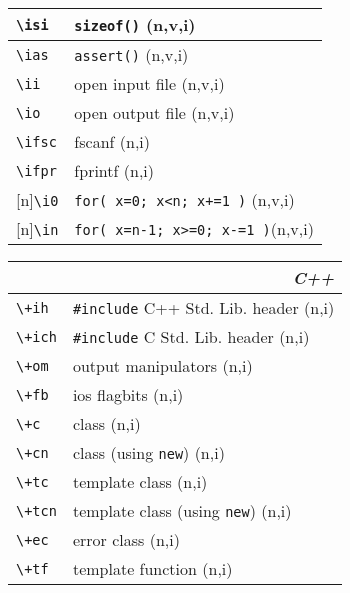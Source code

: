 \documentclass[oneside,11pt,landscape,DIV16]{scrartcl}
\newcommand{\Rep}{{\tiny{[n]}}}
\begin{document}
\begin{multicols}{3}
\begin{center}
\begin{tabular}[]{|p{11mm}|p{60mm}|}
\hline \verb'\isi' & \verb'sizeof()'                    \hfill (n,v,i)\\
\hline \verb'\ias' & \verb'assert()'                    \hfill (n,v,i)\\
\hline \verb'\ii'  & open input file                    \hfill (n,v,i)\\
\hline \verb'\io'  & open output file                   \hfill (n,v,i)\\
\hline \verb'\ifsc'& fscanf                             \hfill (n,i)\\
\hline \verb'\ifpr'& fprintf                            \hfill (n,i)\\
\hline \Rep\verb'\i0'  & \verb'for( x=0; x<n; x+=1 )'   \hfill (n,v,i)\\
\hline \Rep\verb'\in'  & \verb'for( x=n-1; x>=0; x-=1 )'\hfill (n,v,i)\\
\hline
\end{tabular}
%
%
\begin{tabular}[]{|p{12mm}|p{60mm}|}
\hline 
\multicolumn{2}{|r|}{\textsl{C\textbf{++}}} \\
\hline \verb'\+ih'  & \verb$#include$ C++ Std. Lib. header \hfill (n,i)\\
\hline \verb'\+ich' & \verb$#include$ C   Std. Lib. header \hfill (n,i)\\
\hline \verb'\+om'  & output manipulators                  \hfill (n,i)\\
\hline \verb'\+fb'  & ios flagbits                         \hfill (n,i)\\
\hline
\hline \verb'\+c'   & class                                \hfill (n,i)\\
\hline \verb'\+cn'  & class (using \verb'new')             \hfill (n,i)\\
\hline \verb'\+tc'  & template class                       \hfill (n,i)\\
\hline \verb'\+tcn' & template class (using \verb'new')    \hfill (n,i)\\
\hline \verb'\+ec'  & error class                          \hfill (n,i)\\
\hline \verb'\+tf'  & template function                    \hfill (n,i)\\

\end{tabular}
\end{center}
\end{multicols}
\end{document}

